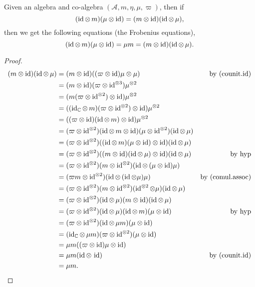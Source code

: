  \begin{theorem}\label{Frobenius_equations}\leanok
  Given an algebra and co-algebra $(\mathcal{A},m,\eta,\mu,\varpi)$, then if
  \[(\id\otimes\,m)(\mu\otimes\id)=(m\otimes\id)(\id\otimes\,\mu),\]
  then we get the following equations (the Frobenius equations),
  \[(\id\otimes\,m)(\mu\otimes\id)=\mu m=(m\otimes\id)(\id\otimes\,\mu).\]
 \end{theorem}
 \begin{proof}\leanok
  \begin{align*}
   (m\otimes\id)(\id\otimes\,\mu) &= (m\otimes\id)((\varpi\otimes\id)\mu\otimes\mu) &\text{by (counit.id)}\\
   &= (m\otimes\id)(\varpi\otimes\id^{\otimes3})\mu^{\otimes2}\\
   &= (m(\varpi\otimes\id^{\otimes2})\otimes\id)\mu^{\otimes2}\\
   &= ((\id_\CC\otimes\,m)(\varpi\otimes\id^{\otimes2})\otimes\id)\mu^{\otimes2}\\
   &= ((\varpi\otimes\id)(\id\otimes\,m)\otimes\id)\mu^{\otimes2}\\
   &= (\varpi\otimes\id^{\otimes2})(\id\otimes\,m\otimes\id)(\mu\otimes\id^{\otimes2})(\id\otimes\,\mu)\\
   &= (\varpi\otimes\id^{\otimes2})((\id\otimes\,m)(\mu\otimes\id)\otimes\id)(\id\otimes\,\mu)\\
   &= (\varpi\otimes\id^{\otimes2})((m\otimes\id)(\id\otimes\,\mu)\otimes\id)(\id\otimes\,\mu) &\text{by hyp}\\
   &= (\varpi\otimes\id^{\otimes2})(m\otimes\id^{\otimes2})(\id\otimes\,(\mu\otimes\id)\mu)\\
   &= (\varpi m\otimes\id^{\otimes2})(\id\otimes\,(\id\otimes\mu)\mu) &\text{by (comul.assoc)}\\
   &= (\varpi\otimes\id^{\otimes2})(m\otimes\id^{\otimes2})(\id^{\otimes2}\otimes\mu)(\id\otimes\,\mu)\\
   &= (\varpi\otimes\id^{\otimes2})(\id\otimes\,\mu)(m\otimes\id)(\id\otimes\,\mu)\\
   &= (\varpi\otimes\id^{\otimes2})(\id\otimes\,\mu)(\id\otimes\,m)(\mu\otimes\id) &\text{by hyp}\\
   &= (\varpi\otimes\id^{\otimes2})(\id\otimes\,\mu m)(\mu\otimes\id)\\
   &= (\id_\CC\otimes\,\mu m)(\varpi\otimes\id^{\otimes2})(\mu\otimes\id)\\
   &= \mu m((\varpi\otimes\id)\mu\otimes\id)\\
   &= \mu m(\id\otimes\,\id) &\text{by (counit.id)}\\
   &= \mu m.
  \end{align*}
 \end{proof}




